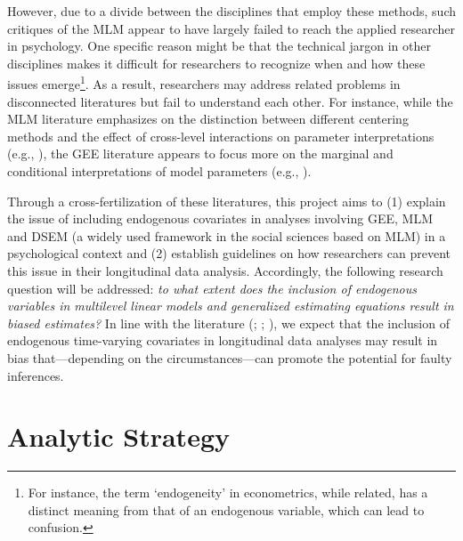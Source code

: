 \documentclass[
  12pt,
  a4paper,
]{article}
\begin{document}
However, due to a divide between the disciplines that employ these
methods, such critiques of the MLM appear to have largely failed to
reach the applied researcher in psychology. One specific reason might be
that the technical jargon in other disciplines makes it difficult for
researchers to recognize when and how these issues emerge\footnote{For
  instance, the term `endogeneity' in econometrics, while related, has a
  distinct meaning from that of an endogenous variable, which can lead
  to confusion.}. As a result, researchers may address related problems
in disconnected literatures but fail to understand each other. For
instance, while the MLM literature emphasizes on the distinction between
different centering methods and the effect of cross-level interactions
on parameter interpretations (e.g., ), the GEE literature appears to focus more on the
marginal and conditional interpretations of model parameters (e.g.,
).

Through a cross-fertilization of these literatures, this project aims to
(1) explain the issue of including endogenous covariates in analyses
involving GEE, MLM and DSEM (a widely used framework in the social
sciences based on MLM) in a psychological context and (2) establish
guidelines on how researchers can prevent this issue in their
longitudinal data analysis. Accordingly, the following research question
will be addressed: \emph{to what extent does the inclusion of endogenous
variables in multilevel linear models and generalized estimating
equations result in biased estimates?} In line with the literature
(; ; ), we
expect that the inclusion of endogenous time-varying covariates in
longitudinal data analyses may result in bias that---depending on the
circumstances---can promote the potential for faulty inferences.

\newpage

\section{Analytic Strategy}\label{analytic-strategy}
\end{document}
